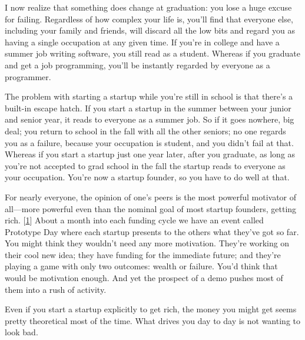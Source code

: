 I now realize
                    that something does change at graduation: you lose a huge
                    excuse for failing. Regardless of how complex your life is,
                    you'll find that everyone else, including your family and
                    friends, will discard all the low bits and regard you as
                    having a single occupation at any given time. If you're in
                    college and have a summer job writing software, you still
                    read as a student. Whereas if you graduate and get a job
                    programming, you'll be instantly regarded by everyone as a
                    programmer.

The problem with starting a startup
                    while you're still in school is that there's a built-in
                    escape hatch. If you start a startup in the summer between
                    your junior and senior year, it reads to everyone as a
                    summer job. So if it goes nowhere, big deal; you return to
                    school in the fall with all the other seniors; no one
                    regards you as a failure, because your occupation is
                    student, and you didn't fail at that. Whereas if you start a
                    startup just one year later, after you graduate, as long as
                    you're not accepted to grad school in the fall the startup
                    reads to everyone as your occupation. You're now a startup
                    founder, so you have to do well at that.

For
                    nearly everyone, the opinion of one's peers is the most
                    powerful motivator of all---more powerful even than the
                    nominal goal of most startup founders, getting rich.
                    [\href{\#f1n}{1}]
                    About a month into each funding cycle we have an event
                    called Prototype Day where each startup presents to the
                    others what they've got so far. You might think they
                    wouldn't need any more motivation. They're working on their
                    cool new idea; they have funding for the immediate future;
                    and they're playing a game with only two outcomes: wealth or
                    failure. You'd think that would be motivation enough. And
                    yet the prospect of a demo pushes most of them into a rush
                    of activity.

Even if you start a startup
                    explicitly to get rich, the money you might get seems pretty
                    theoretical most of the time. What drives you day to day is
                    not wanting to look bad.

